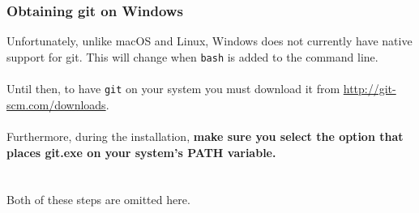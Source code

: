 \documentclass{beamer}\usepackage[]{graphicx}\usepackage[]{color}
\begin{document}
\begin{frame}[fragile]
\frametitle{Obtaining git on Windows}

Unfortunately, unlike macOS and Linux, Windows does not currently have native support for git. This will change when \texttt{bash} is added to the command line.
\\$ $\\
Until then, to have \texttt{git} on your system you must download it from \url{http://git-scm.com/downloads}.
\\$ $\\
Furthermore, during the installation, \textbf{make sure you select the option that places git.exe on your system's PATH variable.} 
\\$ $\\$ $\\
Both of these steps are omitted here.
\end{frame}
\end{document}

